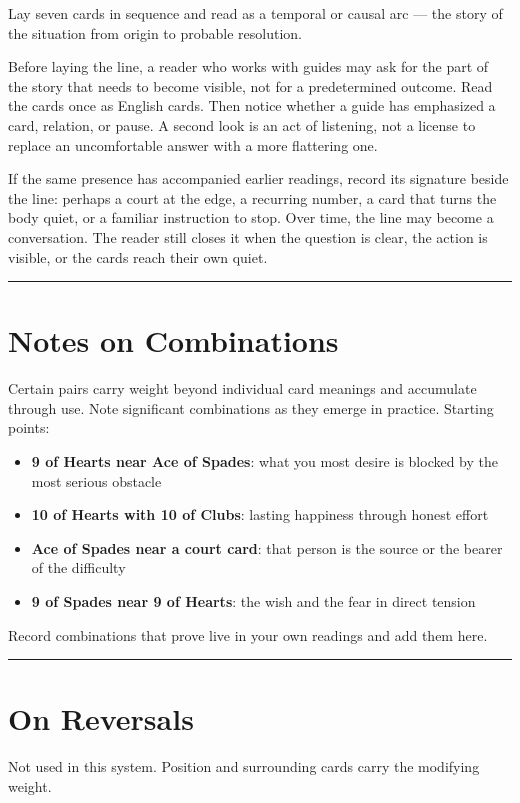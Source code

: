 Lay seven cards in sequence and read as a temporal or causal arc --- the story of the situation from origin to probable resolution.

Before laying the line, a reader who works with guides may ask for the part of
the story that needs to become visible, not for a predetermined outcome. Read
the cards once as English cards. Then notice whether a guide has emphasized a
card, relation, or pause. A second look is an act of listening, not a license to
replace an uncomfortable answer with a more flattering one.

If the same presence has accompanied earlier readings, record its signature
beside the line: perhaps a court at the edge, a recurring number, a card that
turns the body quiet, or a familiar instruction to stop. Over time, the line
may become a conversation. The reader still closes it when the question is
clear, the action is visible, or the cards reach their own quiet.

\begin{center}\rule{0.5\linewidth}{0.5pt}\end{center}

\section{Notes on Combinations}\label{notes-on-combinations}

Certain pairs carry weight beyond individual card meanings and accumulate through use. Note significant combinations as they emerge in practice. Starting points:

\begin{itemize}
\tightlist
\item
  \textbf{9 of Hearts near Ace of Spades}: what you most desire is blocked by the most serious obstacle
\item
  \textbf{10 of Hearts with 10 of Clubs}: lasting happiness through honest effort
\item
  \textbf{Ace of Spades near a court card}: that person is the source or the bearer of the difficulty
\item
  \textbf{9 of Spades near 9 of Hearts}: the wish and the fear in direct tension
\end{itemize}

Record combinations that prove live in your own readings and add them here.

\begin{center}\rule{0.5\linewidth}{0.5pt}\end{center}

\section{On Reversals}\label{on-reversals}

Not used in this system. Position and surrounding cards carry the modifying weight.
